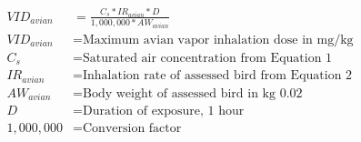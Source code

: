 \documentclass[fleqn, oneside, 11pt]{article}%
\begin{document}
\begin{preview}
\begin{align*}%
VID_{avian} & = \frac{C_{s}*IR_{avian}*D}{1,000,000*AW_{avian}}\nonumber \\
VID_{avian} & =  \text{Maximum avian vapor inhalation dose in mg/kg} \nonumber \\
C_{s} & =  \text{Saturated air concentration from Equation 1} \nonumber \\
IR_{avian} & =  \text{Inhalation rate of assessed bird from Equation 2} \nonumber \\
AW_{avian} & =  \text{Body weight of assessed bird in kg 0.02} \nonumber \\
D & =  \text{Duration of exposure, 1 hour} \nonumber \\
1,000,000 & =  \text{Conversion factor} \nonumber \\
\end{align*} 
\end{preview}
\end{document}
